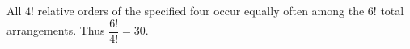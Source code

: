 All $4!$ relative orders of the specified four occur equally often among the $6!$ total arrangements. Thus $\boxed{\dfrac{6!}{4!}=30}$.
